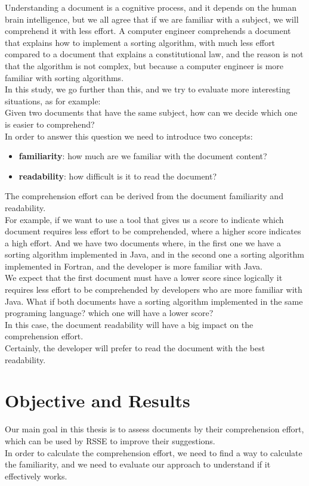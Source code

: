 \documentclass[12pt,mscthesis]{usiinfthesis}
\begin{document}
	Understanding a document is a cognitive process, and it depends on the human brain intelligence, but we all agree that if we are familiar with a subject, we will comprehend it with less effort. A computer engineer comprehends a document that explains how to implement a sorting algorithm, with much less effort compared to a document that explains a constitutional law, and the reason is not that the algorithm is not complex, but because a computer engineer is more familiar with sorting algorithms.\\
	
	In this study, we go further than this, and we try to evaluate more interesting situations, as for example:\\
	Given two documents that have the same subject, how can we decide which one is easier to comprehend?\\
	In order to answer this question we need to introduce two concepts:
	\begin{itemize}
	\item \textbf{familiarity}: how much are we familiar with the document content?
	\item \textbf{readability}: how difficult is it to read the document?
	\end{itemize}
	The comprehension effort can be derived from the document familiarity and readability.\\

	For example, if we want to use a tool that gives us a score to indicate which document requires less effort to be comprehended, where a higher score indicates a high effort. And we have two documents where, in the first one we have a sorting algorithm implemented in Java, and in the second one a sorting algorithm implemented in Fortran, and the developer is more familiar with Java.\\
	We expect that the first document must have a lower score since logically it requires less effort to be comprehended by developers who are more familiar with Java.
	What if both documents have a sorting algorithm implemented in the same programing language? which one will have a lower score? \\
	In this case, the document readability will have a big impact on the comprehension effort.\\
	Certainly, the developer will prefer to read the document with the best readability.\\
	
	\section{Objective and Results}
	Our main goal in this thesis is to assess documents by their comprehension effort, which can be used by RSSE to improve their suggestions.\\
	In order to calculate the comprehension effort, we need to find a way to calculate the familiarity, and we need to evaluate our approach to understand if it effectively works.\\
\end{document}
